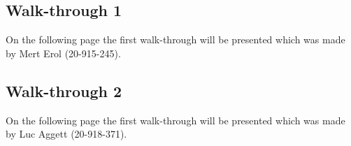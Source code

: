 \documentclass[12pt, letterpaper]{article}
\begin{document}
\subsection{Walk-through 1}
On the following page the first walk-through will be presented which was made by Mert Erol (20-915-245).



\subsection{Walk-through 2}
On the following page the first walk-through will be presented which was made by Luc Aggett (20-918-371).



\end{document}
